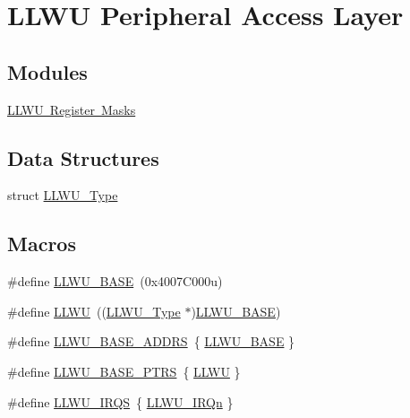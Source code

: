 \hypertarget{group___l_l_w_u___peripheral___access___layer}{}\section{L\+L\+WU Peripheral Access Layer}
\label{group___l_l_w_u___peripheral___access___layer}
\subsection*{Modules}
\begin{DoxyCompactItemize}
\item 
\mbox{\hyperlink{group___l_l_w_u___register___masks}{L\+L\+W\+U Register Masks}}
\end{DoxyCompactItemize}
\subsection*{Data Structures}
\begin{DoxyCompactItemize}
\item 
struct \mbox{\hyperlink{struct_l_l_w_u___type}{L\+L\+W\+U\+\_\+\+Type}}
\end{DoxyCompactItemize}
\subsection*{Macros}
\begin{DoxyCompactItemize}
\item 
\#define \mbox{\hyperlink{group___l_l_w_u___peripheral___access___layer_ga5596067d46debe317ac368bfc5db21f8}{L\+L\+W\+U\+\_\+\+B\+A\+SE}}~(0x4007\+C000u)
\item 
\#define \mbox{\hyperlink{group___l_l_w_u___peripheral___access___layer_gaed2d6ced03dff7739533096e53983dbe}{L\+L\+WU}}~((\mbox{\hyperlink{struct_l_l_w_u___type}{L\+L\+W\+U\+\_\+\+Type}} $\ast$)\mbox{\hyperlink{group___l_l_w_u___peripheral___access___layer_ga5596067d46debe317ac368bfc5db21f8}{L\+L\+W\+U\+\_\+\+B\+A\+SE}})
\item 
\#define \mbox{\hyperlink{group___l_l_w_u___peripheral___access___layer_ga3d947ff94f2db32873659ceeeb8bc767}{L\+L\+W\+U\+\_\+\+B\+A\+S\+E\+\_\+\+A\+D\+D\+RS}}~\{ \mbox{\hyperlink{group___l_l_w_u___peripheral___access___layer_ga5596067d46debe317ac368bfc5db21f8}{L\+L\+W\+U\+\_\+\+B\+A\+SE}} \}
\item 
\#define \mbox{\hyperlink{group___l_l_w_u___peripheral___access___layer_ga4826d688973513cc02a2f1d4f67c336b}{L\+L\+W\+U\+\_\+\+B\+A\+S\+E\+\_\+\+P\+T\+RS}}~\{ \mbox{\hyperlink{group___l_l_w_u___peripheral___access___layer_gaed2d6ced03dff7739533096e53983dbe}{L\+L\+WU}} \}
\item 
\#define \mbox{\hyperlink{group___l_l_w_u___peripheral___access___layer_ga00f85a14dffe324ff8e867f8b06f1461}{L\+L\+W\+U\+\_\+\+I\+R\+QS}}~\{ \mbox{\hyperlink{group___interrupt__vector__numbers_gga666eb0caeb12ec0e281415592ae89083a8b7bac6898a42e6dadf89d7c8b07baaa}{L\+L\+W\+U\+\_\+\+I\+R\+Qn}} \}
\end{DoxyCompactItemize}


